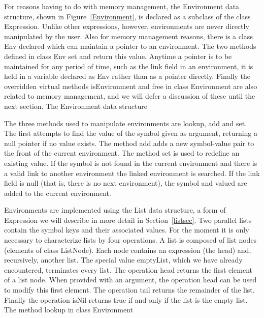 For reasons having to do with memory management, the {\sf Environment} data
structure, shown in Figure~\ref{Environment}, is declared as a subclass of the
class {\sf Expression}.  Unlike other expressions, however, environments are
never directly manipulated by the user.  Also for memory management reasons,
there is a class {\sf Env} declared which can maintain a pointer to an
environment.  The two methods defined in class {\sf Env} set and return this
value.  Anytime a pointer is to be maintained for any period of time, such as
the link field in an environment, it is held in a variable declared as {\sf Env}
rather than as a pointer directly.  Finally the overridden virtual methods {\sf
    isEnvironment} and {\sf free} in class {\sf Environment} are also related to
memory management, and we will defer a discussion of these until the next
section.
%
{The {\sf Environment} data structure}

The three methods used to manipulate environments are {\sf lookup}, {\sf add}
and {\sf set}.  The first attempts to find the value of the symbol given as
argument, returning a null pointer if no value exists.  The method {\sf add}
adds a new symbol-value pair to the front of the current environment.  The
method {\sf set} is used to redefine an existing value.  If the symbol is not
found in the current environment and there is a valid link to another
environment the linked environment is searched.  If the link field is null (that
is, there is no next environment), the symbol and valued are {\sf add}ed to the
current environment.

Environments are implemented using the List data structure, a form of Expression
we will describe in more detail in Section~\ref{listsec}.  Two parallel lists
contain the symbol keys and their associated values.  For the moment it is only
necessary to characterize lists by four operations.  A list is composed of list
nodes (elements of class {\sf ListNode}).  Each node contains an expression (the
head) and, recursively, another list.  The special value {\sf emptyList}, which
we have already encountered, terminates every list.  The operation {\sf head}
returns the first element of a list node.  When provided with an argument, the
operation {\sf head} can be used to modify this first element.  The operation
{\sf tail} returns the remainder of the list.  Finally the operation {\sf isNil}
returns true if and only if the list is the empty list.
%
{The method {\sf lookup} in class {\sf Environment}}

